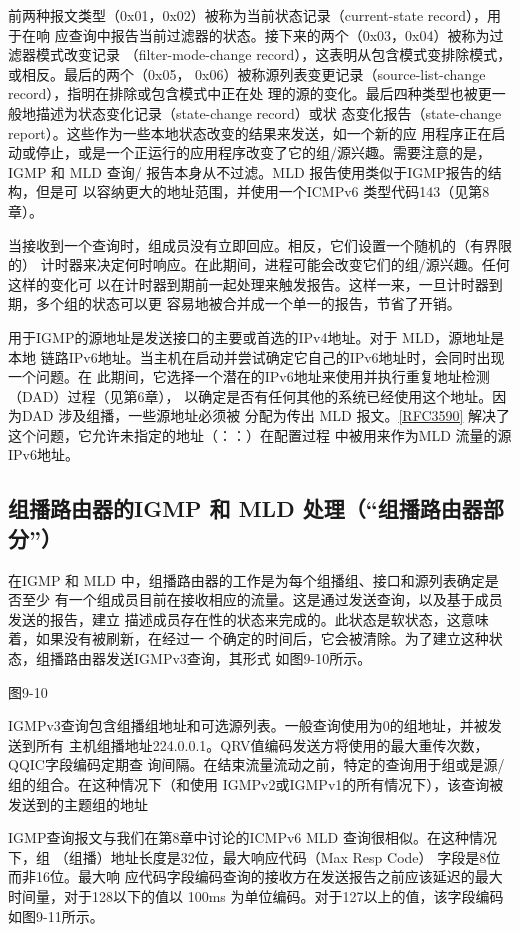 前两种报文类型（0x01，0x02）被称为当前状态记录（current-state record），用于在响
应查询中报告当前过滤器的状态。接下来的两个（0x03，0x04）被称为过滤器模式改变记录
（filter-mode-change record），这表明从包含模式变排除模式，或相反。最后的两个（0x05，
0x06）被称源列表变更记录（source-list-change record），指明在排除或包含模式中正在处
理的源的变化。最后四种类型也被更一般地描述为状态变化记录（state-change record）或状
态变化报告（state-change report）。这些作为一些本地状态改变的结果来发送，如一个新的应
用程序正在启动或停止，或是一个正运行的应用程序改变了它的组/源兴趣。需要注意的是，
IGMP 和 MLD 查询/ 报告本身从不过滤。MLD 报告使用类似于IGMP报告的结构，但是可
以容纳更大的地址范围，并使用一个ICMPv6 类型代码143（见第8章）。

当接收到一个查询时，组成员没有立即回应。相反，它们设置一个随机的（有界限的）
计时器来决定何时响应。在此期间，进程可能会改变它们的组/源兴趣。任何这样的变化可
以在计时器到期前一起处理来触发报告。这样一来，一旦计时器到期，多个组的状态可以更
容易地被合并成一个单一的报告，节省了开销。

用于IGMP的源地址是发送接口的主要或首选的IPv4地址。对于 MLD，源地址是本地
链路IPv6地址。当主机在启动并尝试确定它自己的IPv6地址时，会同时出现一个问题。在
此期间，它选择一个潜在的IPv6地址来使用并执行重复地址检测（DAD）过程（见第6章），
以确定是否有任何其他的系统已经使用这个地址。因为DAD 涉及组播，一些源地址必须被
分配为传出 MLD 报文。\href{https://www.rfc-editor.org/rfc/rfc3590}{[RFC3590]}
解决了这个问题，它允许未指定的地址（：：）在配置过程
中被用来作为MLD 流量的源IPv6地址。

\subsection{组播路由器的IGMP 和 MLD 处理（“组播路由器部分”）}
在IGMP 和 MLD 中，组播路由器的工作是为每个组播组、接口和源列表确定是否至少
有一个组成员目前在接收相应的流量。这是通过发送查询，以及基于成员发送的报告，建立
描述成员存在性的状态来完成的。此状态是软状态，这意味着，如果没有被刷新，在经过一
个确定的时间后，它会被清除。为了建立这种状态，组播路由器发送IGMPv3查询，其形式
如图9-10所示。

图9-10

IGMPv3查询包含组播组地址和可选源列表。一般查询使用为0的组地址，并被发送到所有
主机组播地址224.0.0.1。QRV值编码发送方将使用的最大重传次数，QQIC字段编码定期查
询间隔。在结束流量流动之前，特定的查询用于组或是源/组的组合。在这种情况下（和使用
IGMPv2或IGMPv1的所有情况下），该查询被发送到的主题组的地址

IGMP查询报文与我们在第8章中讨论的ICMPv6 MLD 查询很相似。在这种情况下，组
（组播）地址长度是32位，最大响应代码（Max Resp Code） 字段是8位而非16位。最大响
应代码字段编码查询的接收方在发送报告之前应该延迟的最大时间量，对于128以下的值以
100ms 为单位编码。对于127以上的值，该字段编码如图9-11所示。

